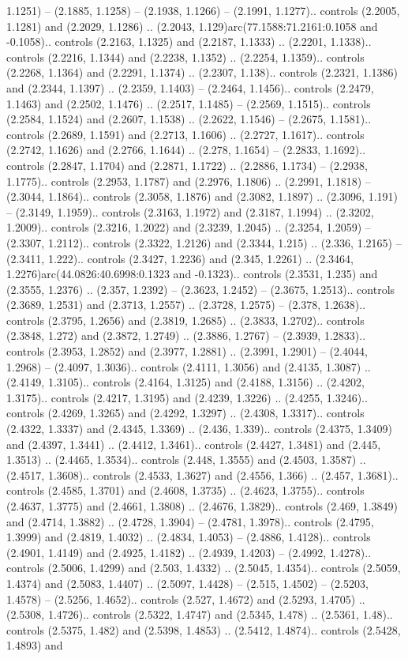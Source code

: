 1.1251) -- (2.1885, 1.1258) -- (2.1938, 1.1266) -- (2.1991, 1.1277).. controls (2.2005, 1.1281) and (2.2029, 1.1286) .. (2.2043, 1.129)arc(77.1588:71.2161:0.1058 and -0.1058).. controls (2.2163, 1.1325) and (2.2187, 1.1333) .. (2.2201, 1.1338).. controls (2.2216, 1.1344) and (2.2238, 1.1352) .. (2.2254, 1.1359).. controls (2.2268, 1.1364) and (2.2291, 1.1374) .. (2.2307, 1.138).. controls (2.2321, 1.1386) and (2.2344, 1.1397) .. (2.2359, 1.1403) -- (2.2464, 1.1456).. controls (2.2479, 1.1463) and (2.2502, 1.1476) .. (2.2517, 1.1485) -- (2.2569, 1.1515).. controls (2.2584, 1.1524) and (2.2607, 1.1538) .. (2.2622, 1.1546) -- (2.2675, 1.1581).. controls (2.2689, 1.1591) and (2.2713, 1.1606) .. (2.2727, 1.1617).. controls (2.2742, 1.1626) and (2.2766, 1.1644) .. (2.278, 1.1654) -- (2.2833, 1.1692).. controls (2.2847, 1.1704) and (2.2871, 1.1722) .. (2.2886, 1.1734) -- (2.2938, 1.1775).. controls (2.2953, 1.1787) and (2.2976, 1.1806) .. (2.2991, 1.1818) -- (2.3044, 1.1864).. controls (2.3058, 1.1876) and (2.3082, 1.1897) .. (2.3096, 1.191) -- (2.3149, 1.1959).. controls (2.3163, 1.1972) and (2.3187, 1.1994) .. (2.3202, 1.2009).. controls (2.3216, 1.2022) and (2.3239, 1.2045) .. (2.3254, 1.2059) -- (2.3307, 1.2112).. controls (2.3322, 1.2126) and (2.3344, 1.215) .. (2.336, 1.2165) -- (2.3411, 1.222).. controls (2.3427, 1.2236) and (2.345, 1.2261) .. (2.3464, 1.2276)arc(44.0826:40.6998:0.1323 and -0.1323).. controls (2.3531, 1.235) and (2.3555, 1.2376) .. (2.357, 1.2392) -- (2.3623, 1.2452) -- (2.3675, 1.2513).. controls (2.3689, 1.2531) and (2.3713, 1.2557) .. (2.3728, 1.2575) -- (2.378, 1.2638).. controls (2.3795, 1.2656) and (2.3819, 1.2685) .. (2.3833, 1.2702).. controls (2.3848, 1.272) and (2.3872, 1.2749) .. (2.3886, 1.2767) -- (2.3939, 1.2833).. controls (2.3953, 1.2852) and (2.3977, 1.2881) .. (2.3991, 1.2901) -- (2.4044, 1.2968) -- (2.4097, 1.3036).. controls (2.4111, 1.3056) and (2.4135, 1.3087) .. (2.4149, 1.3105).. controls (2.4164, 1.3125) and (2.4188, 1.3156) .. (2.4202, 1.3175).. controls (2.4217, 1.3195) and (2.4239, 1.3226) .. (2.4255, 1.3246).. controls (2.4269, 1.3265) and (2.4292, 1.3297) .. (2.4308, 1.3317).. controls (2.4322, 1.3337) and (2.4345, 1.3369) .. (2.436, 1.339).. controls (2.4375, 1.3409) and (2.4397, 1.3441) .. (2.4412, 1.3461).. controls (2.4427, 1.3481) and (2.445, 1.3513) .. (2.4465, 1.3534).. controls (2.448, 1.3555) and (2.4503, 1.3587) .. (2.4517, 1.3608).. controls (2.4533, 1.3627) and (2.4556, 1.366) .. (2.457, 1.3681).. controls (2.4585, 1.3701) and (2.4608, 1.3735) .. (2.4623, 1.3755).. controls (2.4637, 1.3775) and (2.4661, 1.3808) .. (2.4676, 1.3829).. controls (2.469, 1.3849) and (2.4714, 1.3882) .. (2.4728, 1.3904) -- (2.4781, 1.3978).. controls (2.4795, 1.3999) and (2.4819, 1.4032) .. (2.4834, 1.4053) -- (2.4886, 1.4128).. controls (2.4901, 1.4149) and (2.4925, 1.4182) .. (2.4939, 1.4203) -- (2.4992, 1.4278).. controls (2.5006, 1.4299) and (2.503, 1.4332) .. (2.5045, 1.4354).. controls (2.5059, 1.4374) and (2.5083, 1.4407) .. (2.5097, 1.4428) -- (2.515, 1.4502) -- (2.5203, 1.4578) -- (2.5256, 1.4652).. controls (2.527, 1.4672) and (2.5293, 1.4705) .. (2.5308, 1.4726).. controls (2.5322, 1.4747) and (2.5345, 1.478) .. (2.5361, 1.48).. controls (2.5375, 1.482) and (2.5398, 1.4853) .. (2.5412, 1.4874).. controls (2.5428, 1.4893) and 